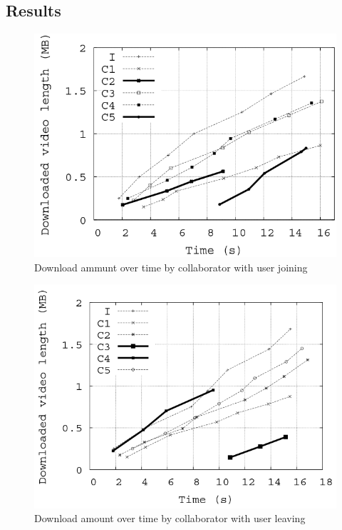 \subsection{Results}
\begin{figure}[hbt]
\centering
\caption{Download ammunt over time by collaborator with user joining \cite{ColStream}}
\label{ColStreamJoin}
\includegraphics[scale=.5]{figures/ColStreamJoin.png}
\end{figure}
\begin{figure}[hbt]
\centering
\caption{Download amount over time by collaborator with user leaving \cite{ColStream}}
\label{ColStreamLeave}
\includegraphics[scale=.5]{figures/ColStreamleave.png}
\end{figure}
